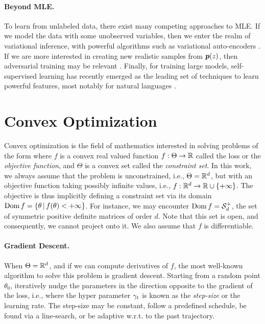 \paragraph{Beyond MLE.}
To learn from unlabeled data, there exist many competing approaches to MLE.
If we model the data with some unobserved variables, then we enter the realm of variational inference, with powerful algorithms such as variational auto-encoders \citep{kingma2013auto}.
If we are more interested in creating new realistic samples from $\bm{p}(z)$, then adversarial training may be relevant \citep{goodfellow2014generative}.
Finally, for training large models, self-supervised learning has recently emerged as the leading set of techniques to learn powerful features, most notably for natural languages \citep{peters2018deep,devlin2018bert}.


\section{Convex Optimization}
Convex optimization is the field of mathematics interested in solving problems of the form
where $f$ is a convex real valued function $f:\Theta \rightarrow \mathbb{R}$ called the loss or the \emph{objective function}, and $\Theta$ is a convex set called the \emph{constraint set}.
In this work, we always assume that the problem is unconstrained, i.e., $\Theta = \mathbb{R}^d$,
but with an objective function taking possibly infinite values, i.e., $f: \mathbb{R}^d \rightarrow \mathbb{R} \cup \{+\infty\}$.
The objective is thus implicitly defining a constraint set via its domain $\operatorname{\mathrm{Dom}} f = \{ \theta \,\vert\, f(\theta) < +\infty \}$.
For instance, we may encounter $\operatorname{\mathrm{Dom}} f = {\mathcal S}_d^+$, the set of symmetric positive definite matrices of order $d$. Note that this set is open, and consequently, we cannot project onto it.
We also assume that $f$ is differentiable.

\paragraph{Gradient Descent.}
When $\Theta = \mathbb{R}^d$, and if we can compute derivatives of $f$, the most well-known algorithm to solve this problem is gradient descent.
Starting from a random point $\theta_0$, iteratively nudge the parameters in the direction opposite to the gradient of the loss, i.e.,
where the hyper parameter $\gamma_t$ is known as the \emph{step-size} or the learning rate.
The step-size may be constant, follow a predefined schedule, be found via a line-search, or be adaptive w.r.t. to the past trajectory.

